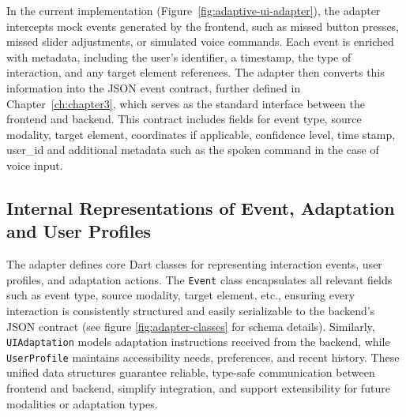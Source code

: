 \documentclass[openany]{book}
\begin{document}
In the current implementation (Figure~\ref{fig:adaptive-ui-adapter}), the adapter intercepts mock events generated by the frontend, such as missed button presses, missed slider adjustments, or simulated voice commands. Each event is enriched with metadata, including the user’s identifier, a timestamp, the type of interaction, and any target element references. The adapter then converts this information into the JSON event contract, further defined in Chapter~\ref{ch:chapter3}, which serves as the standard interface between the frontend and backend. This contract includes fields for event type, source modality, target element, coordinates if applicable, confidence level, time stamp, user\_id and additional metadata such as the spoken command in the case of voice input.

\subsection{Internal Representations of Event, Adaptation and User Profiles}
The adapter defines core Dart classes for representing interaction events, user profiles, and adaptation actions. The \texttt{Event} class encapsulates all relevant fields such as event type, source modality, target element, etc., ensuring every interaction is consistently structured and easily serializable to the backend’s JSON contract (see figure \ref{fig:adapter-classes} for schema details). Similarly, \texttt{UIAdaptation} models adaptation instructions received from the backend, while \texttt{UserProfile} maintains accessibility needs, preferences, and recent history. These unified data structures guarantee reliable, type-safe communication between frontend and backend, simplify integration, and support extensibility for future modalities or adaptation types.
\end{document}
